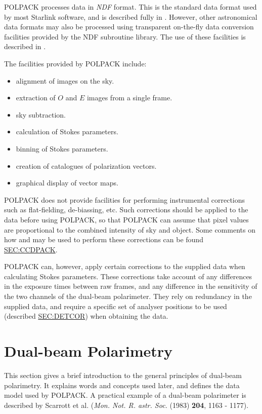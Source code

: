 POLPACK processes data in {\em NDF} format. This is the standard data
format used by most Starlink software, and is described fully in
. However, other astronomical data formats may also
be processed using transparent on-the-fly data conversion facilities
provided by the NDF subroutine library. The use of these facilities is
described in .

The facilities provided by POLPACK include:

\begin{itemize}
\item alignment of images on the sky.
\item extraction of $O$ and $E$ images from a single frame.
\item sky subtraction.
\item calculation of Stokes parameters.
\item binning of Stokes parameters.
\item creation of catalogues of polarization vectors.
\item graphical display of vector maps.
\end{itemize}

POLPACK does not provide facilities for performing instrumental
corrections such as flat-fielding, de-biassing, etc. Such corrections
should be applied to the data before using POLPACK, so that POLPACK can
assume that pixel values are proportional to the combined intensity of sky and
object. Some comments on how  and
 may be used to perform these corrections can be found
\hyperref{here}{in section }{}{SEC:CCDPACK}. 

POLPACK can, however, apply certain corrections to the supplied data when
calculating Stokes parameters. These corrections take account of any
differences in the exposure times between raw frames, and any difference
in the sensitivity of the two channels of the dual-beam polarimeter. They
rely on redundancy in the supplied data, and require a specific set of
analyser positions to be used (described \hyperref{here}{in section }{}
{SEC:DETCOR}) when obtaining the data.

\section{\label{SEC:DBPOL}Dual-beam Polarimetry}
This section gives a brief introduction to the general principles of
dual-beam polarimetry. It explains words and concepts used later, and
defines the data model used by POLPACK. A practical example of a dual-beam 
polarimeter is described by Scarrott et al. ({\em Mon. Not. R. astr. Soc.} 
(1983) {\bf 204}, 1163 - 1177).

